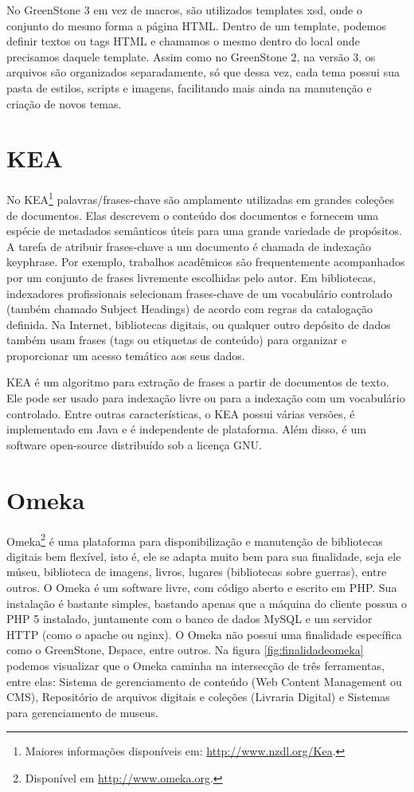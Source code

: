 No GreenStone 3 em vez de macros, são utilizados templates xsd, onde o conjunto do mesmo forma a página HTML. Dentro de um template, podemos definir textos ou tags HTML e chamamos o mesmo dentro do local onde precisamos daquele template. Assim como no GreenStone 2, na versão 3, os arquivos são organizados separadamente, só que dessa vez, cada tema possui sua pasta de estilos, scripts e imagens, facilitando mais ainda na manutenção e criação de novos temas.

\section*{KEA}

No KEA\footnote{Maiores informações disponíveis em: \url{http://www.nzdl.org/Kea}.} palavras/frases-chave são amplamente utilizadas em grandes coleções de documentos. Elas descrevem o conteúdo dos documentos e fornecem uma espécie de metadados semânticos úteis para uma grande variedade de propósitos. A tarefa de atribuir frases-chave a um documento é chamada de indexação keyphrase. Por exemplo, trabalhos acadêmicos são frequentemente acompanhados por um conjunto de frases livremente escolhidas pelo autor. Em bibliotecas, indexadores profissionais selecionam frases-chave de um vocabulário controlado (também chamado Subject Headings) de acordo com regras da catalogação definida. Na Internet, bibliotecas digitais, ou qualquer outro depósito de dados também usam frases (tags ou etiquetas de conteúdo) para organizar e proporcionar um acesso temático aos seus dados.

KEA é um algoritmo para extração de frases a partir de documentos de texto. Ele pode ser usado para indexação livre ou para a indexação com um vocabulário controlado. Entre outras características, o KEA possui várias versões, é implementado em Java e é independente de plataforma. Além disso, é um software open-source distribuído sob a licença GNU.

\section*{Omeka}

Omeka\footnote{Disponível em \url{http://www.omeka.org}.} é uma plataforma para disponibilização e manutenção de  bibliotecas digitais bem flexível, isto é, ele se adapta muito bem para sua finalidade, seja ele múseu, biblioteca de imagens, livros, lugares (bibliotecas sobre guerras), entre outros. O Omeka é um software livre, com código aberto e escrito em PHP. Sua instalação é bastante simples, bastando apenas que a máquina do cliente possua o PHP 5 instalado, juntamente com o banco de dados MySQL e um servidor HTTP (como o apache ou nginx). O Omeka não possui uma finalidade específica como o GreenStone, Dspace, entre outros. Na figura \ref{fig:finalidadeomeka} podemos visualizar que o Omeka caminha na intersecção de três ferramentas, entre elas: Sistema de gerenciamento de conteúdo (Web Content Management ou CMS), Repositório de arquivos digitais e coleções (Livraria Digital) e Sistemas para gerenciamento de museus.

